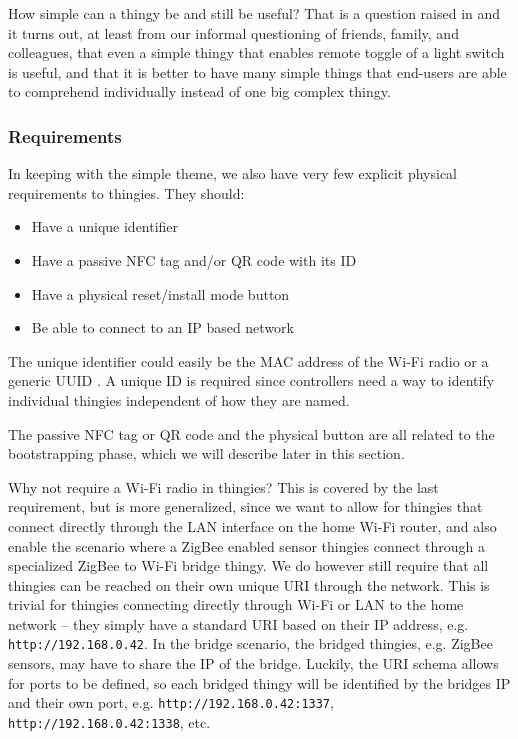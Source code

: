 \documentclass{ubicomp2012}
\begin{document}
How simple can a thingy be and still be useful? That is a question raised in \cite{Edwards01athome} and it turns out, at least from our informal questioning of friends, family, and colleagues, that even a simple thingy that enables remote toggle of a light switch is useful, and that it is better to have many simple things that end-users are able to comprehend individually instead of one big complex thingy.

\subsubsection{Requirements}

In keeping with the simple theme, we also have very few explicit physical requirements to thingies. They should:

\begin{itemize}
\item Have a unique identifier
\item Have a passive NFC tag and/or QR code with its ID
\item Have a physical reset/install mode button
\item Be able to connect to an IP based network
\end{itemize}

The unique identifier could easily be the MAC address of the Wi-Fi radio or a generic UUID \cite{Leach2005}. A unique ID is required since controllers need a way to identify individual thingies independent of how they are named.

The passive NFC tag or QR code and the physical button are all related to the bootstrapping phase, which we will describe later in this section.

Why not require a Wi-Fi radio in thingies? This is covered by the last requirement, but is more generalized, since we want to allow for thingies that connect directly through the LAN interface on the home Wi-Fi router, and also enable the scenario where a ZigBee enabled sensor thingies connect through a specialized ZigBee to Wi-Fi bridge thingy. We do however still require that all thingies can be reached on their own unique URI through the network. This is trivial for thingies connecting directly through Wi-Fi or LAN to the home network -- they simply have a standard URI \cite{uri-rfc} based on their IP address, e.g. \lstinline{http://192.168.0.42}. In the bridge scenario, the bridged thingies, e.g. ZigBee sensors, may have to share the IP of the bridge. Luckily, the URI schema allows for ports to be defined, so each bridged thingy will be identified by the bridges IP and their own port, e.g. \lstinline{http://192.168.0.42:1337}, \lstinline{http://192.168.0.42:1338}, etc.
\end{document}
